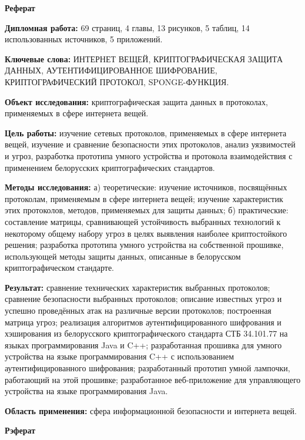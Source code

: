 \newpage
\begin{center}{\bf \Large Реферат}\end{center}
  
\textbf{Дипломная работа:} 69 страниц, 4 главы, 13 рисунков, 5 таблиц, 14 использованных источников,
5 приложений.

\textbf{Ключевые слова:} ИНТЕРНЕТ ВЕЩЕЙ, КРИПТОГРАФИЧЕСКАЯ ЗАЩИТА ДАННЫХ, 
АУТЕНТИФИЦИРОВАННОЕ ШИФРОВАНИЕ, КРИПТОГРАФИЧЕСКИЙ ПРОТОКОЛ,
SPONGE-ФУНКЦИЯ.

\textbf{Объект исследования:} криптографическая защита данных в протоколах, применяемых в сфере 
интернета вещей.

\textbf{Цель работы:} изучение сетевых протоколов, применяемых в сфере интернета вещей, изучение
и сравнение безопасности этих протоколов, анализ уязвимостей и угроз, разработка прототипа умного
устройства и протокола взаимодействия с применением белорусских криптографических стандартов.

\textbf{Методы исследования:} а) теоретические: изучение источников, посвящённых протоколам,
применяемым в сфере интернета вещей; изучение характеристик этих протоколов, методов, применяемых
для защиты данных; б) практические: составление матрицы, сравнивающей устойчивость выбранных 
технологий к некоторому общему набору угроз в целях выявления наиболее криптостойкого решения;
разработка прототипа умного устройства на собственной прошивке, использующей методы защиты
данных, описанные в белорусском криптографическом стандарте.

\textbf{Результат:} сравнение технических характеристик выбранных протоколов; сравнение безопасности
выбранных протоколов; описание известных угроз и успешно проведённых атак на различные версии
протоколов; построенная матрица угроз; реализация алгоритмов аутентифицированного шифрования 
и хэширования из белорусского криптографического стандарта СТБ 34.101.77 на языках программирования
Java и C++; разработанная прошивка для умного устройства на языке программирования C++
с использованием аутентифицированного шифрования; разработанный прототип умной лампочки, работающий
на этой прошивке; разработанное веб-приложение для управляющего устройства на языке
программирования Java.

\textbf{Область применения:} сфера информационной безопасности и интернета вещей.



\newpage
\begin{center}{\bf \Large Рэферат}\end{center}

